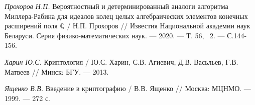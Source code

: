 \begin{thebibliography}{99}
    \textit{Прохоров Н.П.} Вероятностный и детерминированный аналоги алгоритма Миллера-Рабина для идеалов колец целых алгебраических элементов конечных расширений поля $\mathbb{Q}$ / Н.П. Прохоров // Известия Национальной академии наук Беларуси. Серия физико-математических наук. --- 2020. --- Т. 56, \textnumero~2. --- С.144-156.
    
    \textit{Харин Ю.С.} Криптология / Ю.С. Харин, С.В. Агиевич, Д.В. Васьльев, Г.В. Матвеев // Минск: БГУ. --- 2013.

    \textit{Ященко В.В.} Введение в криптографию / В.В. Ященко // Москва: МЦНМО. --- 1999. --- 272 с.

\end{thebibliography}









